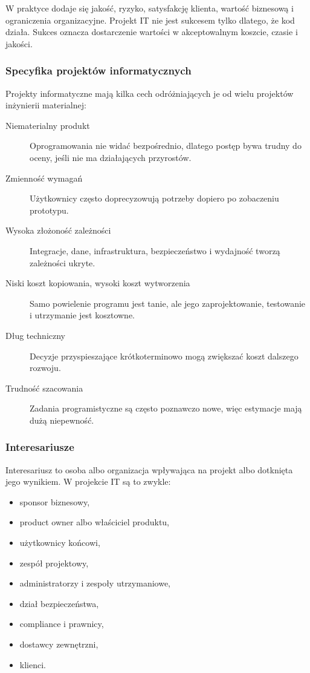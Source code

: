 W praktyce dodaje się jakość, ryzyko, satysfakcję klienta, wartość biznesową i ograniczenia organizacyjne. Projekt IT nie jest sukcesem tylko dlatego, że kod działa. Sukces oznacza dostarczenie wartości w akceptowalnym koszcie, czasie i jakości.

\subsubsection{Specyfika projektów informatycznych}

Projekty informatyczne mają kilka cech odróżniających je od wielu projektów inżynierii materialnej:
\begin{description}
  \item[Niematerialny produkt] Oprogramowania nie widać bezpośrednio, dlatego postęp bywa trudny do oceny, jeśli nie ma działających przyrostów.
  \item[Zmienność wymagań] Użytkownicy często doprecyzowują potrzeby dopiero po zobaczeniu prototypu.
  \item[Wysoka złożoność zależności] Integracje, dane, infrastruktura, bezpieczeństwo i wydajność tworzą zależności ukryte.
  \item[Niski koszt kopiowania, wysoki koszt wytworzenia] Samo powielenie programu jest tanie, ale jego zaprojektowanie, testowanie i utrzymanie jest kosztowne.
  \item[Dług techniczny] Decyzje przyspieszające krótkoterminowo mogą zwiększać koszt dalszego rozwoju.
  \item[Trudność szacowania] Zadania programistyczne są często poznawczo nowe, więc estymacje mają dużą niepewność.
\end{description}

\subsubsection{Interesariusze}

Interesariusz to osoba albo organizacja wpływająca na projekt albo dotknięta jego wynikiem. W projekcie IT są to zwykle:
\begin{itemize}
  \item sponsor biznesowy,
  \item product owner albo właściciel produktu,
  \item użytkownicy końcowi,
  \item zespół projektowy,
  \item administratorzy i zespoły utrzymaniowe,
  \item dział bezpieczeństwa,
  \item compliance i prawnicy,
  \item dostawcy zewnętrzni,
  \item klienci.
\end{itemize}

